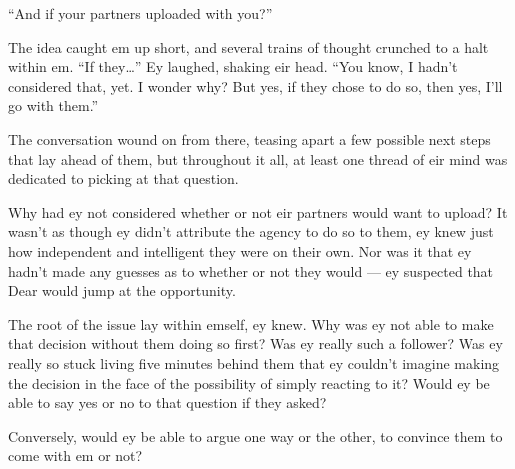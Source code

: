 ``And if your partners uploaded with you?''

The idea caught em up short, and several trains of thought crunched to a halt within em. ``If they\ldots{}'' Ey laughed, shaking eir head. ``You know, I hadn't considered that, yet. I wonder why? But yes, if they chose to do so, then yes, I'll go with them.''

The conversation wound on from there, teasing apart a few possible next steps that lay ahead of them, but throughout it all, at least one thread of eir mind was dedicated to picking at that question.

Why had ey not considered whether or not eir partners would want to upload? It wasn't as though ey didn't attribute the agency to do so to them, ey knew just how independent and intelligent they were on their own. Nor was it that ey hadn't made any guesses as to whether or not they would — ey suspected that Dear would jump at the opportunity.

The root of the issue lay within emself, ey knew. Why was ey not able to make that decision without them doing so first? Was ey really such a follower? Was ey really so stuck living five minutes behind them that ey couldn't imagine making the decision in the face of the possibility of simply reacting to it? Would ey be able to say yes or no to that question if they asked?

Conversely, would ey be able to argue one way or the other, to convince them to come with em or not?
